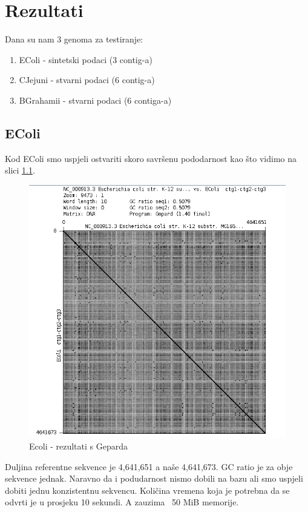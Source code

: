 \chapter{Rezultati}
Dana su nam 3 genoma za testiranje:
\begin{enumerate}
\item EColi - sintetski podaci (3 contig-a)
\item CJejuni - stvarni podaci (6 contig-a)
\item BGrahamii - stvarni podaci (6 contiga-a)
\end{enumerate}
\section{EColi}
Kod EColi smo uspjeli ostvariti skoro savršenu pododarnost kao što vidimo na slici \ref{fig:ecoli}.

\begin{figure}[H]
    \centering
    \includegraphics[scale=0.45]{img/EColi.png}
    \caption{Ecoli - rezultati s Geparda}
    \label{fig:ecoli}
\end{figure}

Duljina referentne sekvence je 4,641,651 a naše 4,641,673. GC ratio je za obje sekvence jednak. Naravno da i podudarnost nismo dobili na bazu ali smo uspjeli dobiti jednu konzistentnu sekvencu. Količina vremena koja je potrebna da se odvrti je u prosjeku 10 sekundi. A zauzima ~50 MiB memorije.

